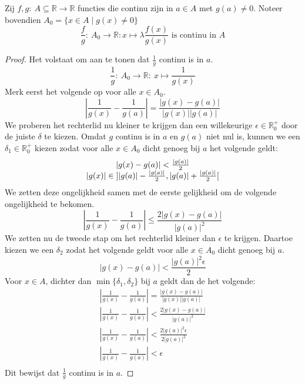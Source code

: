\documentclass[main.tex]{subfiles}
\begin{document}
\begin{pr}
  Zij $f,g:\ A \subseteq \mathbb{R} \rightarrow \mathbb{R}$ functies die continu zijn in $a\in A$ met $g(a)\neq 0$.
  Noteer bovendien $A_{0} = \{ x \in A \mid g(x) \neq 0 \}$
  \[ \frac{f}{g}:\ A_{0} \rightarrow \mathbb{R}: x \mapsto \lambda \frac{f(x)}{g(x)} \text{ is continu in } A \]

  \begin{proof}
    Het volstaat om aan te tonen dat $\frac{1}{g}$ continu is in $a$.
    \[ \frac{1}{g}:\ A_{0}\rightarrow \mathbb{R}:\ x \mapsto \frac{1}{g(x)} \]
    Merk eerst het volgende op voor alle $x\in A_{0}$.
    \[ \left| \frac{1}{g(x)} - \frac{1}{g(a)} \right| = \frac{|g(x)-g(a)|}{|g(x)||g(a)|} \]
    We proberen het rechterlid nu kleiner te krijgen dan een willekeurige $\epsilon \in \mathbb{R}_{0}^{+}$ door de juiste $\delta$ te kiezen.
    Omdat $g$ continu is in $a$ en $g(a)$ niet nul is, kunnen we een $\delta_{1} \in \mathbb{R}_{0}^{+}$ kiezen zodat voor alle $x\in A_{0}$ dicht genoeg bij $a$ het volgende geldt:
    \[ 
    \begin{array}{c}
      |g(x)-g(a)| < \frac{|g(a)|}{2}\\
      |g(x)| \in \interval[open]{|g(a)|-\frac{|g(a)|}{2}}{|g(a)|+\frac{|g(a)|}{2}}\\
    \end{array}
    \]
    We zetten deze ongelijkheid samen met de eerste gelijkheid om de volgende ongelijkheid te bekomen.
    \[ \left| \frac{1}{g(x)} - \frac{1}{g(a)} \right| \le \frac{2|g(x)-g(a)|}{|g(a)|^{2}} \]
    We zetten nu de tweede stap om het rechterlid kleiner dan $\epsilon$ te krijgen.
    Daartoe kiezen we een $\delta_{2}$ zodat het volgende geldt voor alle $x\in A_{0}$ dicht genoeg bij $a$.
    \[ |g(x)-g(a)| < \frac{|g(a)|^{2}\epsilon}{2} \]
    Voor $x\in A$, dichter dan $\min\{\delta_{1},\delta_{2}\}$ bij $a$ geldt dan de het volgende:
    \[ 
    \begin{array}{c}
      \left| \frac{1}{g(x)} - \frac{1}{g(a)} \right| = \frac{|g(x)-g(a)|}{|g(x)||g(a)|}\\
      \left| \frac{1}{g(x)} - \frac{1}{g(a)} \right| < \frac{2|g(x)-g(a)|}{|g(a)|^{2}}\\
      \left| \frac{1}{g(x)} - \frac{1}{g(a)} \right| < \frac{2|g(a)|^{2}\epsilon}{2|g(a)|^{2}}\\
      \left| \frac{1}{g(x)} - \frac{1}{g(a)} \right| < \epsilon \\
    \end{array}
    \]
    Dit bewijst dat $\frac{1}{g}$ continu is in $a$.
  \end{proof}
\end{pr}
\end{document}
